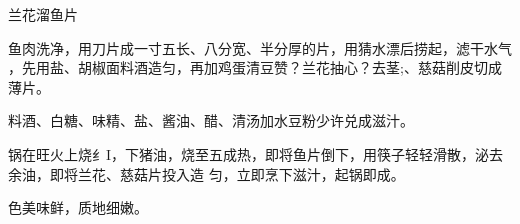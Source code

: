 \begin{recipe}{兰花溜鱼片}

\ingredients


\cooking

\step 鱼肉洗净，用刀片成一寸五长、八分宽、半分厚的片，用猜水漂后捞起，滤干水气
，先用盐、胡椒面料酒造匀，再加鸡蛋清豆赞？兰花抽心？去茎;、慈菇削皮切成薄片。

\step 料酒、白糖、味精、盐、酱油、醋、清汤加水豆粉少许兑成滋汁。

\step 锅在旺火上烧纟I，下猪油，烧至五成热，即将鱼片倒下，用筷子轻轻滑散，泌去
余油，即将兰花、慈菇片投入造 匀，立即烹下滋汁，起锅即成。

\features

色美味鲜，质地细嫩。

\end{recipe}

